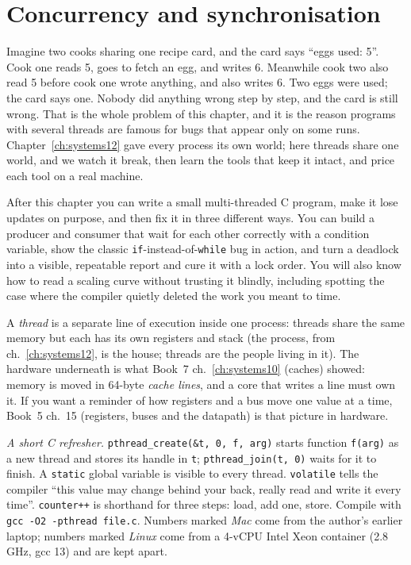 \chapter{Concurrency and synchronisation}
\label{ch:systems13}

Imagine two cooks sharing one recipe card, and the card says
``eggs used: 5''. Cook one reads 5, goes to fetch an egg, and writes
6. Meanwhile cook two also read 5 before cook one wrote anything, and
also writes 6. Two eggs were used; the card says one. Nobody did
anything wrong step by step, and the card is still wrong. That is
the whole problem of this chapter, and it is the reason programs
with several threads are famous for bugs that appear only on some
runs. Chapter~\ref{ch:systems12} gave every process its own world;
here threads share one world, and we watch it break, then learn
the tools that keep it intact, and price each tool on a real
machine.

\begin{wins}
After this chapter you can write a small multi-threaded C program,
make it lose updates on purpose, and then fix it in three different
ways. You can build a producer and consumer that wait for each other
correctly with a condition variable, show the classic
\texttt{if}-instead-of-\texttt{while} bug in action, and turn a
deadlock into a visible, repeatable report and cure it with a lock
order. You will also know how to read a scaling curve without
trusting it blindly, including spotting the case where the compiler
quietly deleted the work you meant to time.
\end{wins}

\begin{rulebox}
A \emph{thread} is a separate line of execution inside one process:
threads share the same memory but each has its own registers and
stack (the process, from ch.~\ref{ch:systems12}, is the house; threads
are the people living in it). The hardware underneath is what Book~7
ch.~\ref{ch:systems10} (caches) showed: memory is moved in 64-byte
\emph{cache lines}, and a core that writes a line must own it. If you
want a reminder of how registers and a bus move one value at a time,
Book~5 ch.~15 (registers, buses and the datapath) is that picture
in hardware.

\emph{A short C refresher.} \texttt{pthread\_create(\&t, 0, f, arg)}
starts function \texttt{f(arg)} as a new thread and stores its handle
in \texttt{t}; \texttt{pthread\_join(t, 0)} waits for it to finish.
A \texttt{static} global variable is visible to every thread.
\texttt{volatile} tells the compiler ``this value may change behind
your back, really read and write it every time''. \texttt{counter++}
is shorthand for three steps: load, add one, store. Compile with
\texttt{gcc -O2 -pthread file.c}. Numbers marked \emph{Mac} come from
the author's earlier laptop; numbers marked \emph{Linux} come from a
4-vCPU Intel Xeon container (2.8\,GHz, gcc 13) and are kept apart.
\end{rulebox}

